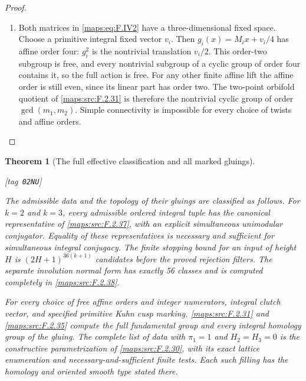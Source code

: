 \documentclass[11pt,a4paper]{article}
\numberwithin{equation}{section}
\newtheorem{theorem}{Theorem}[section]
\theoremstyle{definition}
\newcommand{\StatementRecord}[4]{{\upshape\footnotesize[tag~\texttt{#3}]}\enspace\ignorespaces}
\begin{document}
\begin{proof}
\begin{enumerate}[label=\arabic*.]
\item Both matrices in \eqref{maps:eq:F.IV2} have a three-dimensional fixed
space.  Choose a primitive integral fixed vector $v_i$.
Then $g_i(x)=M_ix+v_i/4$ has affine order four:
$g_i^2$ is the nontrivial translation $v_i/2$.
This order-two subgroup is free, and every nontrivial
subgroup of a cyclic group of order four contains it, so
the full action is free.  For any other finite affine lift
the affine order is still even, since its linear part has
order two.  The two-point orbifold quotient of \ref{maps:src:F.2.31} is
therefore the nontrivial cyclic group of order
$\gcd(m_1,m_2)$.  Simple connectivity is impossible for
every choice of twists and affine orders.

\end{enumerate}
\end{proof}




\begin{theorem}[The full effective classification and all marked gluings]\hypertarget{tag-02NU}{}\label{maps:src:F.2.39}
\StatementRecord{maps:src:F.2.39}{proved}{02NU}{\cref{maps:src:F.2.37}, \cref{maps:src:F.2.38}, \cref{maps:src:F.2.31}, \cref{maps:src:F.2.35}, \cref{maps:src:F.2.30}, \cref{maps:src:F.2.1}, \cref{maps:src:F.2.2}, \cref{maps:src:F.2.36}, \eqref{maps:eq:F.CN3}, \cref{maps:src:F.2.33}, \cref{maps:src:F.2.7}}


The admissible data and the topology of their gluings are classified as follows.
For $k=2$ and $k=3$, every admissible ordered integral tuple
has the canonical representative of \ref{maps:src:F.2.37}, with an explicit
simultaneous unimodular conjugator.  Equality of these
representatives is necessary and sufficient for simultaneous
integral conjugacy.  The finite stopping bound for an input of height $H$ is
$(2H+1)^{36(k+1)}$ candidates before the proved rejection
filters.  The separate involution normal form has exactly
56 classes and is computed completely in \ref{maps:src:F.2.38}.

For every choice of free affine orders and integer
numerators, integral clutch vector, and specified primitive
Kuhn cusp marking, \ref{maps:src:F.2.31} and \ref{maps:src:F.2.35} compute the full
fundamental group and every integral homology group of the
gluing.    The complete list of data
with $\pi_1=1$ and $H_2=H_3=0$ is the constructive
parametrization of \ref{maps:src:F.2.30}, with its exact lattice enumeration
and necessary-and-sufficient finite tests.  Each such filling has the homology and oriented smooth type stated
there.

\end{theorem}
\end{document}
